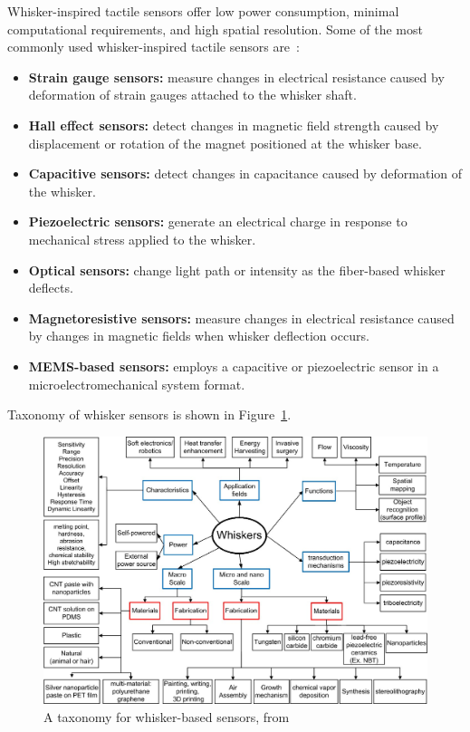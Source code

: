 Whisker-inspired tactile sensors offer low power consumption, minimal computational requirements, and high spatial resolution.
Some of the most commonly used whisker-inspired tactile sensors are~\cite{s22072705}:
\begin{itemize}
    \item \textbf{Strain gauge sensors:} measure changes in electrical resistance caused by deformation of strain gauges attached to the whisker shaft.
    \item \textbf{Hall effect sensors:} detect changes in magnetic field strength caused by displacement or rotation of the magnet positioned at the whisker base.
    \item \textbf{Capacitive sensors:} detect changes in capacitance caused by deformation of the whisker.
    \item \textbf{Piezoelectric sensors:} generate an electrical charge in response to mechanical stress applied to the whisker.
    \item \textbf{Optical sensors:} change light path or intensity as the fiber-based whisker deflects.
    \item \textbf{Magnetoresistive sensors:} measure changes in electrical resistance caused by changes in magnetic fields when whisker deflection occurs.
    \item \textbf{MEMS-based sensors:} employs a capacitive or piezoelectric sensor in a microelectromechanical system format.
\end{itemize}
Taxonomy of whisker sensors is shown in Figure~\ref{fig:taxonomy}.

\begin{figure}[htb]
    \centering
    \includegraphics[width=0.65\textheight]{figures/taxonomy}
    \caption{A taxonomy for whisker-based sensors, from \cite{s22072705}}
    \label{fig:taxonomy}
\end{figure}


